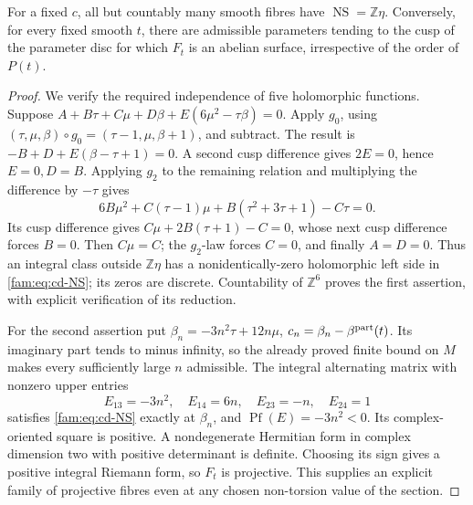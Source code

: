 \begin{proposition}\label{fam:src:D.1.5}\label{fam:st:D.1.5}
For a fixed \(c\), all but countably many smooth fibres have
\(\operatorname{NS}=\mathbb Z\eta\). Conversely, for every fixed smooth
\(t\), there are admissible parameters tending to the cusp of the
parameter disc for which \(F_t\) is an abelian surface, irrespective of
the order of \(P(t)\).
\end{proposition}
\begin{proof}
We verify the required independence of five holomorphic functions.
Suppose \(A+B\tau+C\mu+D\beta+E(6\mu^2-\tau\beta)=0\).
Apply \(g_0\), using \((\tau,\mu,\beta)\circ g_0=(\tau-1,\mu,\beta+1)\),
and subtract. The result is \(-B+D+E(\beta-\tau+1)=0\).
A second cusp difference gives \(2E=0\), hence \(E=0,D=B\).
Applying \(g_2\) to the remaining relation and multiplying the difference
by \(-\tau\) gives
\[
 6B\mu^2+C(\tau-1)\mu+B(\tau^2+3\tau+1)-C\tau=0.
\]
Its cusp difference gives \(C\mu+2B(\tau+1)-C=0\), whose next cusp
difference forces \(B=0\). Then \(C\mu=C\); the \(g_2\)-law forces
\(C=0\), and finally \(A=D=0\). Thus an integral class outside
\(\mathbb Z\eta\) has a nonidentically-zero holomorphic left side in
\eqref{fam:eq:cd-NS}; its zeros are discrete. Countability of \(\mathbb Z^6\)
proves the first assertion, with explicit verification of its reduction.

For the second assertion put
\(\beta_n=-3n^2\tau+12n\mu\),
\(c_n=\beta_n-\beta^{\rm part}(t)\). Its imaginary part tends to
minus infinity, so the already proved finite bound on \(M\) makes every
sufficiently large \(n\) admissible. The integral alternating matrix
with nonzero upper entries
\[
 E_{13}=-3n^2,\quad E_{14}=6n,\quad E_{23}=-n,\quad E_{24}=1
\]
satisfies \eqref{fam:eq:cd-NS} exactly at \(\beta_n\), and
\(\operatorname{Pf}(E)=-3n^2<0\). Its complex-oriented square is positive.
A nondegenerate Hermitian form in complex dimension two with positive
determinant is definite. Choosing its sign gives a positive integral
Riemann form, so \(F_t\) is projective. This supplies an explicit family
of projective fibres even at any chosen non-torsion value of the section.
\end{proof}

